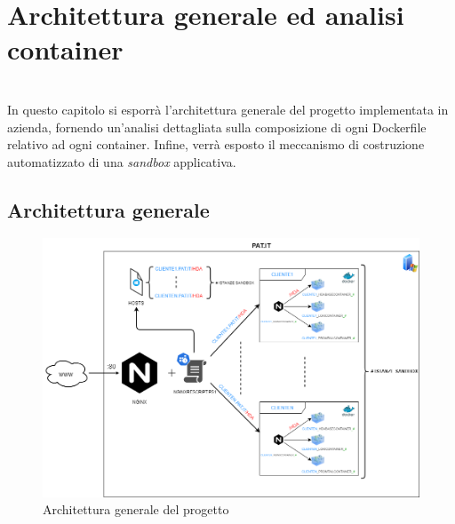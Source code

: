 
\chapter{Architettura generale ed analisi container}
\label{cap:architettura-progetto-container}

\\
In questo capitolo si esporrà l'architettura generale del progetto implementata in azienda, fornendo un'analisi dettagliata sulla composizione di ogni Dockerfile relativo ad ogni container. Infine, verrà esposto il meccanismo di costruzione automatizzato di una \textit{sandbox} applicativa.

\section{Architettura generale}
\begin{figure}[!h]     
\centering 
    \includegraphics[width=1.0\columnwidth]{immagini/img/hda_containerized_architecture} 
    \caption{Architettura generale del progetto}
\end{figure} 

